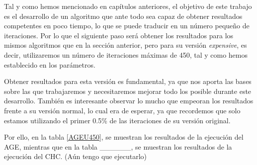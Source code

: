 Tal y como hemos mencionado en capítulos anteriores, el objetivo de este trabajo es el desarrollo de un algoritmo que ante todo sea capaz de obtener resultados competentes en poco tiempo, lo que se puede traducir en un número pequeño de iteraciones. 
Por lo que el siguiente paso será obtener los resultados para los mismos algoritmos que en la sección anterior, pero para su versión \textit{expensive}, es decir, utilizaremos un número de iteraciones máximas de 450, tal y como hemos establecido en los parámetros. 

Obtener resultados para esta versión es fundamental, ya que nos aporta las bases sobre las que trabajaremos y necesitaremos mejorar todo los posible durante este desarrollo. 
También es interesante observar lo mucho que empeoran los resultados frente a su versión normal, lo cual era de esperar, ya que recordemos que solo estamos utilizando el primer 0.5\% de las iteraciones de su versión original. 

Por ello, en la tabla \ref{AGEU450}, se muestran los resultados de la ejecución del AGE, mientras que en la tabla \_\_\_\_\_\_, se muestran los resultados de la ejecución del CHC. (Aún tengo que ejecutarlo)


